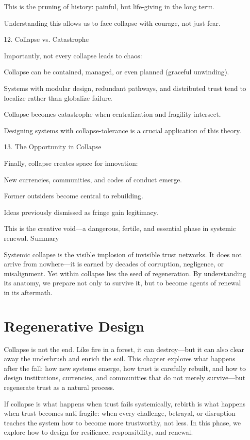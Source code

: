 \documentclass[11pt,oneside]{book}
\begin{document}
    This is the pruning of history: painful, but life-giving in the long term.

Understanding this allows us to face collapse with courage, not just fear.

12. Collapse vs. Catastrophe


Importantly, not every collapse leads to chaos:

    Collapse can be contained, managed, or even planned (graceful unwinding).

    Systems with modular design, redundant pathways, and distributed trust tend to localize rather than globalize failure.

    Collapse becomes catastrophe when centralization and fragility intersect.

Designing systems with collapse-tolerance is a crucial application of this theory.

13. The Opportunity in Collapse


Finally, collapse creates space for innovation:

    New currencies, communities, and codes of conduct emerge.

    Former outsiders become central to rebuilding.

    Ideas previously dismissed as fringe gain legitimacy.

This is the creative void—a dangerous, fertile, and essential phase in systemic renewal.
Summary

Systemic collapse is the visible implosion of invisible trust networks. It does not arrive from nowhere—it is earned by decades of corruption, negligence, or misalignment. Yet within collapse lies the seed of regeneration. By understanding its anatomy, we prepare not only to survive it, but to become agents of renewal in its aftermath.


\chapter{Regenerative Design}

Collapse is not the end. Like fire in a forest, it can destroy—but it can also clear away the underbrush and enrich the soil. This chapter explores what happens after the fall: how new systems emerge, how trust is carefully rebuilt, and how to design institutions, currencies, and communities that do not merely survive—but regenerate trust as a natural process.

If collapse is what happens when trust fails systemically, rebirth is what happens when trust becomes anti-fragile: when every challenge, betrayal, or disruption teaches the system how to become more trustworthy, not less. In this phase, we explore how to design for resilience, responsibility, and renewal.
\end{document}
